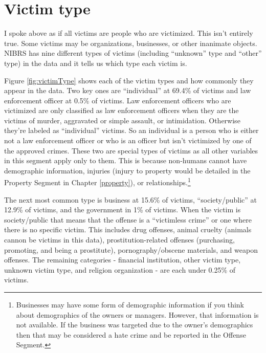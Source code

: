 \documentclass[
]{krantz}
\begin{document}
\section{Victim type}\label{victim-type}

I spoke above as if all victims are people who are
victimized. This isn't entirely true. Some victims may be
organizations, businesses, or other inanimate objects. NIBRS
has nine different types of victims (including ``unknown''
type and ``other'' type) in the data and it tells us which
type each victim is.

Figure \ref{fig:victimType} shows each of the victim types
and how commonly they appear in the data. Two key ones are
``individual'' at 69.4\% of victims and law enforcement
officer at 0.5\% of victims. Law enforcement officers who
are victimized are only classified as law enforcement
officers when they are the victims of murder, aggravated or
simple assault, or intimidation. Otherwise they're labeled
as ``individual'' victims. So an individual is a person who
is either not a law enforcement officer or who is an officer
but isn't victimized by one of the approved crimes. These
two are special types of victims as all other variables in
this segment apply only to them. This is because non-humans
cannot have demographic information, injuries (injury to
property would be detailed in the Property Segment in
Chapter \ref{property}), or relationships.\footnote{Businesses
  may have some form of demographic information if you think
  about demographics of the owners or managers. However,
  that information is not available. If the business was
  targeted due to the owner's demographics then that may be
  considered a hate crime and be reported in the Offense
  Segment.}

The next most common type is business at 15.6\% of victims,
``society/public'' at 12.9\% of victims, and the government
in 1\% of victims. When the victim is society/public that
means that the offense is a ``victimless crime'' or one
where there is no specific victim. This includes drug
offenses, animal cruelty (animals cannon be victims in this
data), prostitution-related offenses (purchasing, promoting,
and being a prostitute), pornography/obscene materials, and
weapon offenses. The remaining categories - financial
institution, other victim type, unknown victim type, and
religion organization - are each under 0.25\% of victims.
\end{document}
